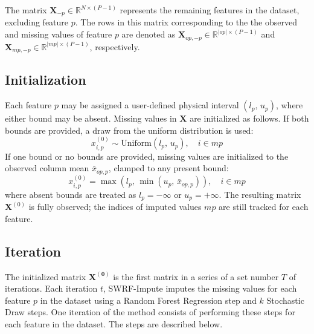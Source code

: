\documentclass[preprint]{aastex631}
\begin{document}
The matrix $\mathbf{X}_{-p} \in \mathbb{R}^{N\times(P-1)}$ represents the remaining features in the dataset, excluding feature $p$. The rows in this matrix corresponding to the the observed and missing values of feature $p$ are denoted as $\mathbf{X}_{op,-p} \in \mathbb{R}^{|op|\times (P-1)}$ and $\mathbf{X}_{mp,-p} \in \mathbb{R}^{|mp| \times (P-1)}$, respectively.

\subsection{Initialization}
Each feature $p$ may be assigned a user-defined physical interval $(l_p,\, u_p)$, where either bound may be absent. Missing values in $\mathbf{X}$ are initialized as follows. If both bounds are provided, a draw from the uniform distribution is used:
\begin{equation}
  x^{(0)}_{i,p} \sim \mathrm{Uniform}(l_p,\, u_p), \quad i \in mp
\end{equation}
If one bound or no bounds are provided, missing values are initialized to the observed column mean $\bar{x}_{op,p}$, clamped to any present bound:
\begin{equation}
  x^{(0)}_{i,p} = \max(l_p,\, \min(u_p,\, \bar{x}_{op,p})), \quad i \in mp
\end{equation}
where absent bounds are treated as $l_p = -\infty$ or $u_p = +\infty$. The resulting matrix $\mathbf{X}^{(0)}$ is fully observed; the indices of imputed values $mp$ are still tracked for each feature.

\subsection{Iteration}
The initialized matrix $\mathbf{X^{(0)}}$ is the first matrix in a series of a set number $T$ of iterations. Each iteration $t$, SWRF-Impute imputes the missing values for each feature $p$ in the dataset using a Random Forest Regression step and $k$ Stochastic Draw steps. One iteration of the method consists of performing these steps for each feature in the dataset. The steps are described below.
\end{document}
